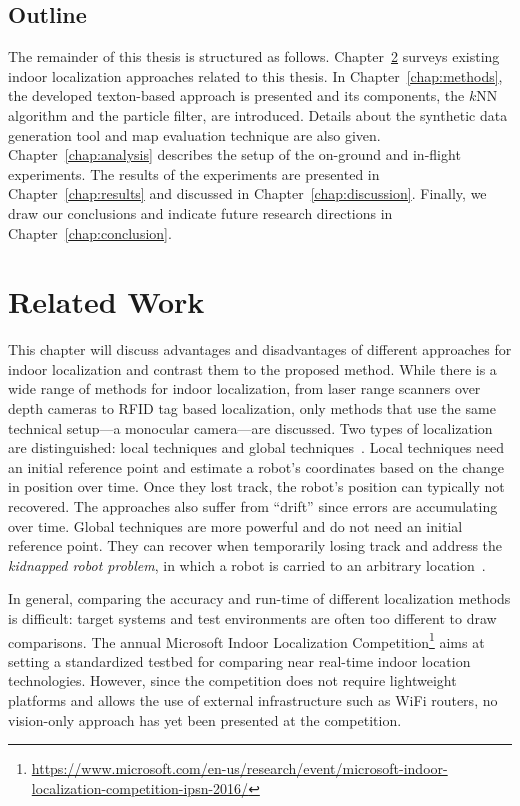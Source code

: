 \documentclass{report}
\begin{document}
\section{Outline}
\label{sec:outline}

The remainder of this thesis is structured as follows.
Chapter~\ref{chap:relatedwork} surveys existing indoor localization
approaches related to this thesis. In Chapter~\ref{chap:methods}, the
developed texton-based approach is presented and its components, the
$k$NN algorithm and the particle filter, are introduced. Details about
the synthetic data generation tool and map evaluation technique are
also given. Chapter~\ref{chap:analysis} describes the setup of the
on-ground and in-flight experiments. The results of the experiments
are presented in Chapter~\ref{chap:results} and discussed in
Chapter~\ref{chap:discussion}. Finally, we draw our conclusions and
indicate future research directions in Chapter~\ref{chap:conclusion}.

\chapter{Related Work}
\label{chap:relatedwork}

This chapter will discuss advantages and disadvantages of different
approaches for indoor localization and contrast them to the proposed
method. While there is a wide range of methods for indoor
localization, from laser range scanners over depth cameras to RFID tag
based localization, only methods that use the same technical setup---a
monocular camera---are discussed. Two types of localization are
distinguished: local techniques and global
techniques~\cite{fox1999monte}. Local techniques need an initial
reference point and estimate a robot's coordinates based on the change
in position over time. Once they lost track, the robot's position can
typically not recovered. The approaches also suffer from ``drift''
since errors are accumulating over time. Global techniques are more
powerful and do not need an initial reference point. They can recover
when temporarily losing track and address the \emph{kidnapped robot
  problem}, in which a robot is carried to an arbitrary
location~\cite{engelson1992error}.

In general, comparing the accuracy and run-time of different
localization methods is difficult: target systems and test
environments are often too different to draw comparisons. The annual
Microsoft Indoor Localization
Competition\footnote{\url{https://www.microsoft.com/en-us/research/event/microsoft-indoor-localization-competition-ipsn-2016/}}
aims at setting a standardized testbed for comparing near real-time
indoor location technologies. However, since the competition does not
require lightweight platforms and allows the use of external
infrastructure such as WiFi routers, no vision-only approach has yet
been presented at the competition.
\end{document}
